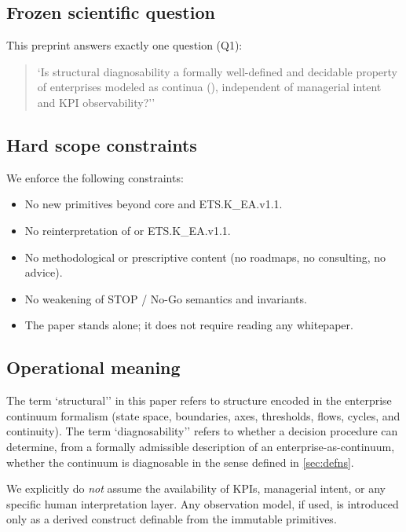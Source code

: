\subsection{Frozen scientific question}
This preprint answers exactly one question (Q1):
\begin{quote}
`Is structural diagnosability a formally well-defined and decidable property of
enterprises modeled as continua (\KEA), independent of managerial intent and KPI
observability?''
\end{quote}

\subsection{Hard scope constraints}
We enforce the following constraints:
\begin{itemize}
  \item No new primitives beyond \OC{} core and ETS.K\_EA.v1.1.
  \item No reinterpretation of \OC{} or ETS.K\_EA.v1.1.
  \item No methodological or prescriptive content (no roadmaps, no consulting, no advice).
  \item No weakening of STOP / No-Go semantics and invariants.
  \item The paper stands alone; it does not require reading any whitepaper.
\end{itemize}

\subsection{Operational meaning}
The term `structural'' in this paper refers to structure encoded in the
enterprise continuum formalism (state space, boundaries, axes, thresholds,
flows, cycles, and continuity). The term `diagnosability'' refers to whether
a decision procedure can determine, from a formally admissible description of an
enterprise-as-continuum, whether the continuum is diagnosable in the sense
defined in \cref{sec:defns}.

We explicitly do \emph{not} assume the availability of KPIs, managerial intent,
or any specific human interpretation layer. Any observation model, if used, is
introduced only as a derived construct definable from the immutable primitives.
